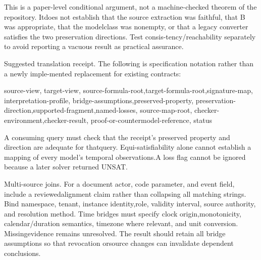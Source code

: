 \noindent
This is a paper-level conditional argument, not a machine-checked theorem of the repository. It\linebreak[4]
does not establish that the source extraction was faithful, that B was appropriate, that the model\linebreak[4]
class was nonempty, or that a legacy converter satisfies the two preservation directions. Test consis-\linebreak[4]
tency/reachability separately to avoid reporting a vacuous result as practical assurance.\par

\noindent
Suggested translation receipt. The following is specification notation rather than a newly imple-\linebreak[4]
mented replacement for existing contracts:\par

\noindent
source-view, target-view, source-formula-root,\linebreak[4]
target-formula-root,\linebreak[4]
signature-map, interpretation-profile, bridge-assumptions,\linebreak[4]
preserved-property, preservation-direction,\linebreak[4]
supported-fragment,\linebreak[4]
named-losses, source-map-root, checker-environment,\linebreak[4]
checker-result, proof-or-countermodel-reference, status\par

\noindent
A consuming query must check that the receipt's preserved property and direction are adequate for that\linebreak[4]
query. Equi-satisfiability alone cannot establish a mapping of every model's temporal observations.\linebreak[4]
A loss flag cannot be ignored because a later solver returned UNSAT.\par

\noindent
Multi-source joins. For a document actor, code parameter, and event field, include a reviewed\linebreak[4]
alignment claim rather than collapsing all matching strings. Bind namespace, tenant, instance identity,\linebreak[4]
role, validity interval, source authority, and resolution method. Time bridges must specify clock origin,\linebreak[4]
monotonicity, calendar/duration semantics, timezone where relevant, and unit conversion. Missing\linebreak[4]
evidence remains unresolved. The result should retain all bridge assumptions so that revocation or\linebreak[4]
source changes can invalidate dependent conclusions.\par

